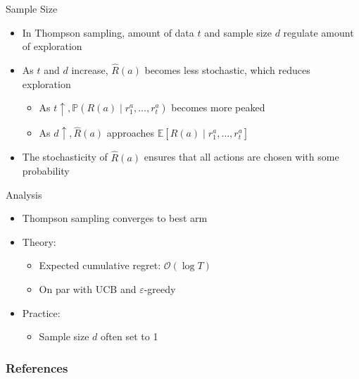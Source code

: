 \documentclass[11pt,table]{beamer}
\begin{document}
\begin{frame}{Sample Size}


    \begin{itemize}
        \item In Thompson sampling, amount of data $t$ and sample size $d$ regulate amount of exploration

\item  As $t$ and $d$ increase, $\hat{R}(a)$ becomes less stochastic, which reduces exploration

\begin{itemize}
    
\item  \textcolor{red1}{As $t \uparrow, \mathbb{P}\left(R(a) \mid r_{1}^{a}, \ldots, r_{t}^{a}\right)$ becomes more peaked}
\item  \textcolor{red1}{As $d \uparrow, \hat{R}(a)$ approaches $\mathbb{E}\left[R(a) \mid r_{1}^{a}, \ldots, r_{t}^{a}\right]$}
 
\end{itemize}
\item  The stochasticity of $\hat{R}(a)$ ensures that all actions are chosen with some probability 
    \end{itemize}
\end{frame}

\begin{frame}{Analysis}


\begin{itemize}
    \item Thompson sampling converges to best arm
    \item Theory:
 
\begin{itemize}
    \item Expected cumulative regret: \textcolor{red1}{$\mathcal{O}(\log T)$}
\item On par with UCB and $\varepsilon$-greedy
 
\end{itemize} 
\item Practice:
 \begin{itemize}
     \item Sample size $d$ often set to 1
 
 \end{itemize}
\end{itemize}
    
\end{frame}


\begin{frame}[t,allowframebreaks
]%
\frametitle{References}
\small

\end{frame}
\end{document}
